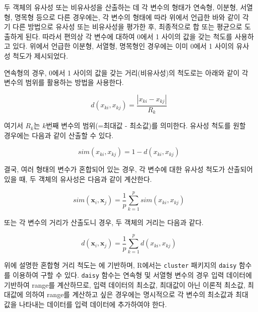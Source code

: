 \documentclass[
]{book}
\begin{document}
두 객체의 유사성 또는 비유사성을 산출하는 데 각 변수의 형태가 연속형, 이분형, 서열형, 명목형 등으로 다른 경우에는, 각 변수의 형태에 따라 위에서 언급한 바와 같이 각기 다른 방법으로 유사성 또는 비유사성을 평가한 후, 최종적으로 합 또는 평균으로 도출하게 된다. 따라서 편의상 각 변수에 대하여 0에서 1 사이의 값을 갖는 척도를 사용하고 있다. 위에서 언급한 이분형, 서열형, 명목형인 경우에는 이미 0에서 1 사이의 유사성 척도가 제시되었다.

연속형의 경우, 0에서 1 사이의 값을 갖는 거리(비유사성)의 척도로는 아래와 같이 각 변수의 범위를 활용하는 방법을 사용한다.

\begin{equation*}
d(x_{ki}, x_{kj}) = \frac{|x_{ki} - x_{kj}|}{R_k}
\end{equation*}

여기서 \(R_k\)는 \(k\)번째 변수의 범위(=최대값 - 최소값)를 의미한다. 유사성 척도를 원할 경우에는 다음과 같이 산출할 수 있다.

\begin{equation*}
sim(x_{ki}, x_{kj}) = 1 - d(x_{ki}, x_{kj})
\end{equation*}

결국, 여러 형태의 변수가 혼합되어 있는 경우, 각 변수에 대한 유사성 척도가 산출되어 있을 때, 두 객체의 유사성은 다음과 같이 계산한다.

\begin{equation*}
sim(\mathbf{x}_i, \mathbf{x}_j) = \frac{1}{p} \sum_{k = 1}^{p} sim(x_{ki}, x_{kj})
\end{equation*}

또는 각 변수의 거리가 산출도니 경우, 두 객체의 거리는 다음과 같다.

\begin{equation*}
d(\mathbf{x}_i, \mathbf{x}_j) = \frac{1}{p} \sum_{k = 1}^{p} d(x_{ki}, x_{kj})
\end{equation*}

위에 설명한 혼합형 거리 척도는 \citet{gower1971general} 에 기반하며, R에서는 \texttt{cluster} 패키지의 \texttt{daisy} 함수를 이용하여 구할 수 있다. \texttt{daisy} 함수는 연속형 및 서열형 변수의 경우 입력 데이터에 기반하여 range를 계산하므로, 입력 데이터의 최소값, 최대값이 아닌 이론적 최소값, 최대값에 의하여 range를 계산하고 싶은 경우에는 명시적으로 각 변수의 최소값과 최대값을 나타내는 데이터를 입력 데이터에 추가하여야 한다.
\end{document}
